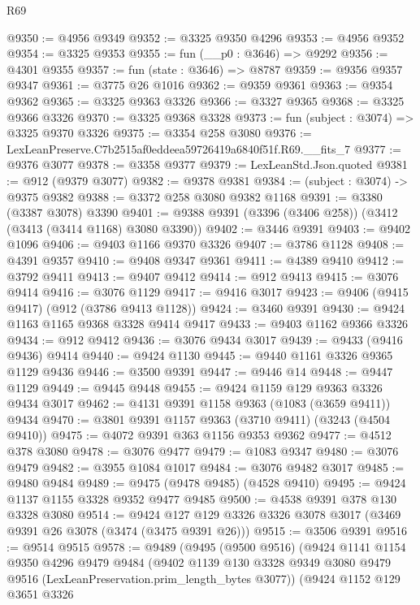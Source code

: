 \begin{lexlean}{R69}
\begin{coremodule}
@9350 := @4956 @9349
@9352 := @3325 @9350 @4296
@9353 := @4956 @9352
@9354 := @3325 @9353
@9355 := fun (__p0 : @3646) => @9292
@9356 := @4301 @9355
@9357 := fun (state : @3646) => @8787
@9359 := @9356 @9357 @9347
@9361 := @3775 @26 @1016
@9362 := @9359 @9361
@9363 := @9354 @9362
@9365 := @3325 @9363 @3326
@9366 := @3327 @9365
@9368 := @3325 @9366 @3326
@9370 := @3325 @9368 @3328
@9373 := fun (subject : @3074) => @3325 @9370 @3326
@9375 := @3354 @258 @3080
@9376 := LexLeanPreserve.C7b2515af0eddeea59726419a6840f51f.R69.__fits_7
@9377 := @9376 @3077
@9378 := @3358 @9377
@9379 := LexLeanStd.Json.quoted
@9381 := @912 (@9379 @3077)
@9382 := @9378 @9381
@9384 := (subject : @3074) -> @9375 @9382
@9388 := @3372 @258 @3080 @9382 @1168
@9391 := @3380 (@3387 @3078) @3390
@9401 := @9388 @9391 (@3396 (@3406 @258)) (@3412 (@3413 (@3414 @1168) @3080 @3390))
@9402 := @3446 @9391
@9403 := @9402 @1096
@9406 := @9403 @1166 @9370 @3326
@9407 := @3786 @1128
@9408 := @4391 @9357
@9410 := @9408 @9347 @9361
@9411 := @4389 @9410
@9412 := @3792 @9411
@9413 := @9407 @9412
@9414 := @912 @9413
@9415 := @3076 @9414
@9416 := @3076 @1129
@9417 := @9416 @3017
@9423 := @9406 (@9415 @9417) (@912 (@3786 @9413 @1128))
@9424 := @3460 @9391
@9430 := @9424 @1163 @1165 @9368 @3328 @9414 @9417
@9433 := @9403 @1162 @9366 @3326
@9434 := @912 @9412
@9436 := @3076 @9434 @3017
@9439 := @9433 (@9416 @9436) @9414
@9440 := @9424 @1130
@9445 := @9440 @1161 @3326 @9365 @1129 @9436
@9446 := @3500 @9391
@9447 := @9446 @14
@9448 := @9447 @1129
@9449 := @9445 @9448
@9455 := @9424 @1159 @129 @9363 @3326 @9434 @3017
@9462 := @4131 @9391 @1158 @9363 (@1083 (@3659 @9411)) @9434
@9470 := @3801 @9391 @1157 @9363 (@3710 @9411) (@3243 (@4504 @9410))
@9475 := @4072 @9391 @363 @1156 @9353 @9362
@9477 := @4512 @378 @3080
@9478 := @3076 @9477
@9479 := @1083 @9347
@9480 := @3076 @9479
@9482 := @3955 @1084 @1017
@9484 := @3076 @9482 @3017
@9485 := @9480 @9484
@9489 := @9475 (@9478 @9485) (@4528 @9410)
@9495 := @9424 @1137 @1155 @3328 @9352 @9477 @9485
@9500 := @4538 @9391 @378 @130 @3328 @3080
@9514 := @9424 @127 @129 @3326 @3326 @3078 @3017 (@3469 @9391 @26 @3078 (@3474 (@3475 @9391 @26)))
@9515 := @3506 @9391
@9516 := @9514 @9515
@9578 := @9489
    (@9495
      (@9500 @9516)
      (@9424
        @1141
        @1154
        @9350
        @4296
        @9479
        @9484
        (@9402
          @1139
          @130
          @3328
          @9349
          @3080
          @9479
          @9516
          (LexLeanPreservation.prim_length_bytes @3077))
        (@9424
          @1152
          @129
          @3651
          @3326

\end{coremodule}
\end{lexlean}
